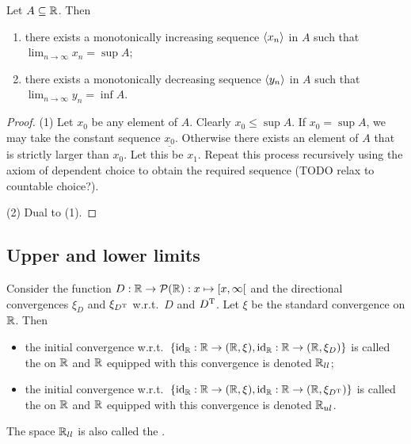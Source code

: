 \begin{proposition} \label{sequencesToExtrema}
Let $A\subseteq \mathbb{R}$. Then
\begin{enumerate}
\item there exists a monotonically increasing sequence $\left\langle x_n \right\rangle$ in $A$ such that $\lim_{n\to\infty}x_n = \sup A$;
\item there exists a monotonically decreasing sequence $\left\langle y_n \right\rangle$ in $A$ such that $\lim_{n\to\infty}y_n = \inf A$.
\end{enumerate}
\end{proposition}
\begin{proof}
(1) Let $x_0$ be any element of $A$. Clearly $x_0\leq \sup A$. If $x_0 = \sup A$, we may take the constant sequence $\underline{x_0}$. Otherwise there exists an element of $A$ that is strictly larger than $x_0$. Let this be $x_1$. Repeat this process recursively using the axiom of dependent choice to obtain the required sequence (TODO relax to countable choice?).

(2) Dual to (1).
\end{proof}

\subsection{Upper and lower limits}
\begin{definition}
Consider the function $D: \R \to\powerset(\R): x\mapsto \interval[co]{x,\infty}$ and the directional convergences $\xi_D$ and $\xi_{D^{\mathrm{T}}}$ w.r.t.\ $D$ and $D^{\mathrm{T}}$. Let $\xi$ be the standard convergence on $\mathbb{R}$.
Then
\begin{itemize}
\item the initial convergence w.r.t.\ $\{\id_\R: \R\to \sSet{\R,\xi}, \id_\R: \R\to \sSet{\R,\xi_D}\}$ is called the  on $\mathbb{R}$ and $\mathbb{R}$ equipped with this convergence is denoted $\mathbb{R}_{ll}$;
\item the initial convergence w.r.t.\ $\{\id_\R: \R\to \sSet{\R,\xi}, \id_\R: \R\to \sSet{\R,\xi_{D^\transp}}\}$ is called the  on $\mathbb{R}$ and $\mathbb{R}$ equipped with this convergence is denoted $\mathbb{R}_{ul}$.
\end{itemize}
The space $\mathbb{R}_{ll}$ is also called the .
\end{definition}

